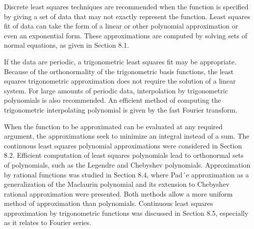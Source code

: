 \documentclass[12pt]{article}
\theoremstyle{theorem}
\begin{document}
Discrete least squares techniques are recommended when the function is specified by
giving a set of data that may not exactly represent the function. Least squares fit of data
can take the form of a linear or other polynomial approximation or even an exponential
form. These approximations are computed by solving sets of normal equations, as given in
Section 8.1.

If the data are periodic, a trigonometric least squares fit may be appropriate. Because
of the orthonormality of the trigonometric basis functions, the least squares trigonometric
approximation does not require the solution of a linear system. For large amounts of
periodic data, interpolation by trigonometric polynomials is also recommended. An efficient
method of computing the trigonometric interpolating polynomial is given by the fast
Fourier transform.

When the function to be approximated can be evaluated at any required argument,
the approximations seek to minimize an integral instead of a sum. The continuous least
squares polynomial approximations were considered in Section 8.2. Efficient computation
of least squares polynomials lead to orthonormal sets of polynomials, such as the Legendre
and Chebyshev polynomials. Approximation by rational functions was studied in Section
8.4, where Pad´e approximation as a generalization of the Maclaurin polynomial and its extension
to Chebyshev rational approximation were presented. Both methods allow a more
uniform method of approximation than polynomials. Continuous least squares approximation
by trigonometric functions was discussed in Section 8.5, especially as it relates to
Fourier series.

\newpage

\nocite{*}

 
\end{document}
